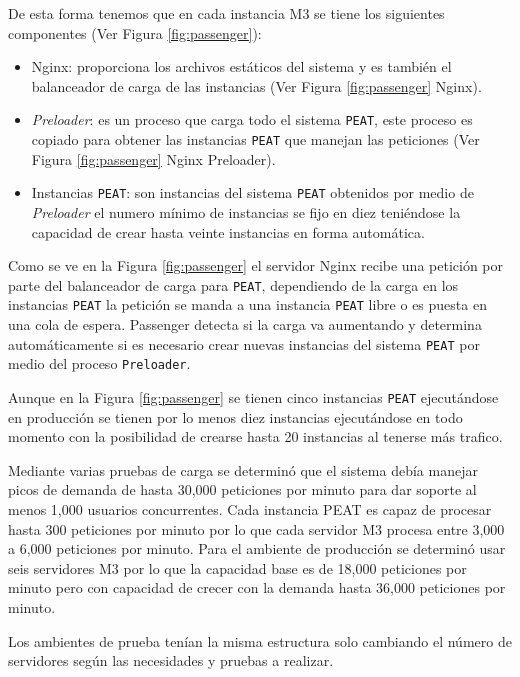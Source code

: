 De esta forma tenemos que en cada instancia M3 se tiene los
siguientes componentes (Ver Figura \ref{fig:passenger}):
\begin{itemize}
\item Nginx: proporciona los archivos estáticos del sistema y es también el
  balanceador de carga de las instancias (Ver Figura \ref{fig:passenger} Nginx).
\item \textit{Preloader}: es un proceso que carga todo el sistema \texttt{PEAT},
  este proceso es copiado para obtener las instancias \texttt{PEAT} que manejan las
  peticiones (Ver Figura \ref{fig:passenger} Nginx Preloader).
\item Instancias \texttt{PEAT}: son instancias del sistema \texttt{PEAT} obtenidos
  por medio de \textit{Preloader} el numero mínimo de instancias se fijo en diez
  teniéndose la capacidad de crear hasta veinte instancias en forma automática.
\end{itemize}


Como se ve en la Figura \ref{fig:passenger} el servidor Nginx recibe una petición
por parte del balanceador de carga para \texttt{PEAT}, dependiendo de la carga
en los instancias \texttt{PEAT} la petición se manda a una instancia \texttt{PEAT}
libre o es puesta en una cola de espera. Passenger detecta si la carga va aumentando
y determina automáticamente si es necesario crear nuevas instancias del sistema
\texttt{PEAT} por medio del proceso \texttt{Preloader}.

Aunque en la Figura \ref{fig:passenger} se tienen cinco instancias \texttt{PEAT}
ejecutándose en producción se tienen por lo menos diez instancias ejecutándose en
todo momento con la posibilidad de crearse hasta 20 instancias al tenerse más
trafico.

Mediante varias pruebas de carga se determinó que el sistema debía manejar picos
de demanda de hasta 30,000 peticiones por minuto para dar soporte al menos
1,000 usuarios concurrentes. Cada instancia PEAT es capaz de procesar hasta
300 peticiones por minuto por lo que cada servidor M3 procesa entre
3,000 a 6,000 peticiones por minuto. Para el ambiente de producción se determinó
usar seis servidores M3 por lo que la capacidad base es de 18,000
peticiones por minuto pero con capacidad de crecer con la demanda hasta
36,000 peticiones por minuto.

Los ambientes de prueba tenían la misma estructura solo cambiando el número
de servidores según las necesidades y pruebas a realizar.

